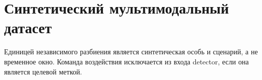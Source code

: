 \chapter{Синтетический мультимодальный датасет}

Единицей независимого разбиения является синтетическая особь и сценарий, а не временное
окно. Команда воздействия исключается из входа detector, если она является целевой меткой.

